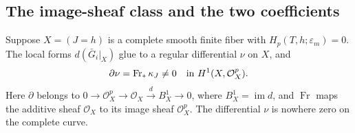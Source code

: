 \subsection{The image-sheaf class and the two coefficients}

\begin{proposition}
\label{first:tangent}
Suppose $X=(J=h)$ is a complete smooth finite fiber with
$H_p(T,h;\varepsilon_m)=0$. The local forms
$d(\bar G_i|_X)$ glue to a regular differential $\nu$ on $X$, and
\begin{equation}
 \partial\nu=\operatorname{Fr}_*\kappa_J\ne0
 \quad\hbox{in }H^1(X,\mathcal O_X^p).
 \label{first:image-class}
\end{equation}
Here $\partial$ belongs to
$0\to\mathcal O_X^p\to\mathcal O_X\xrightarrow{d}B_X^1\to0$,
where $B_X^1=\operatorname{im}d$, and $\operatorname{Fr}$ maps the
additive sheaf $\mathcal O_X$ to its image sheaf $\mathcal O_X^p$.
The differential $\nu$ is nowhere zero on the complete curve.
\end{proposition}

